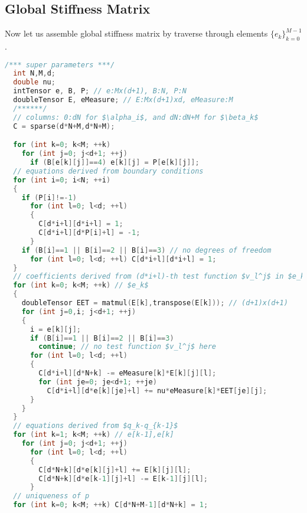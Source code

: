 \subsection{Global Stiffness Matrix}
Now let us assemble global stiffness matrix by traverse through elements $\{e_k\}_{k=0}^{M-1}$.
\begin{lstlisting}[caption=GlobalStiffnessMatrix,
language=C++,keywordstyle=\color{blue},commentstyle=\color{red!80!green!80!blue!80},frame=lines,
rulesepcolor=\color{red!50!green!50!blue!50},tabsize=2,mathescape=true]
  /*** super parameters ***/
  int N,M,d; 
  double nu;
  intTensor e, B, P; // e:Mx(d+1), B:N, P:N
  doubleTensor E, eMeasure; // E:Mx(d+1)xd, eMeasure:M
  /******/
  // columns: 0:dN for $\alpha_i$, and dN:dN+M for $\beta_k$
  C = sparse(d*N+M,d*N+M); 

  for (int k=0; k<M; ++k) 
    for (int j=0; j<d+1; ++j)
      if (B[e[k][j]]==4) e[k][j] = P[e[k][j]];
  // equations derived from boundary conditions
  for (int i=0; i<N; ++i)
  {
    if (P[i]!=-1) 
      for (int l=0; l<d; ++l)
      {
        C[d*i+l][d*i+l] = 1;
        C[d*i+l][d*P[i]+l] = -1;
      }
    if (B[i]==1 || B[i]==2 || B[i]==3) // no degrees of freedom
      for (int l=0; l<d; ++l) C[d*i+l][d*i+l] = 1;
  }
  // coefficients derived from (d*i+l)-th test function $v_l^j$ in $e_k,i=e_k^j$
  for (int k=0; k<M; ++k) // $e_k$
  {
    doubleTensor EET = matmul(E[k],transpose(E[k])); // (d+1)x(d+1)
    for (int j=0,i; j<d+1; ++j)
    {
      i = e[k][j]; 
      if (B[i]==1 || B[i]==2 || B[i]==3)
        continue; // no test function $v_l^j$ here
      for (int l=0; l<d; ++l)
      {
        C[d*i+l][d*N+k] -= eMeasure[k]*E[k][j][l];
        for (int je=0; je<d+1; ++je)
          C[d*i+l][d*e[k][je]+l] += nu*eMeasure[k]*EET[je][j];
      }
    }
  }
  // equations derived from $q_k-q_{k-1}$
  for (int k=1; k<M; ++k) // e[k-1],e[k]
    for (int j=0; j<d+1; ++j)
      for (int l=0; l<d; ++l)
      {
        C[d*N+k][d*e[k][j]+l] += E[k][j][l];
        C[d*N+k][d*e[k-1][j]+l] -= E[k-1][j][l];
      }
  // uniqueness of p
  for (int k=0; k<M; ++k) C[d*N+M-1][d*N+k] = 1;
\end{lstlisting}
